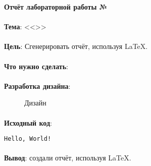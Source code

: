\documentclass[12pt, a4paper, simple]{eskdtext}
\begin{document}
  

  \begin{center}
    \textbf{Отчёт лабораторной работы №\envReportLabNumber}
  \end{center}

  \paragraph{} \textbf{Тема}: <<\envReportTitle>>

  \paragraph{} \textbf{Цель}: Сгенерировать отчёт, используя \LaTeX.

  \paragraph{} \textbf{Что нужно сделать}:

  \paragraph{} \textbf{Разработка дизайна}:

  \begin{figure}[!h]
    \centering
    \caption{Дизайн}
  \end{figure}

  \paragraph{} \textbf{Исходный код}: 



  \begin{lstlisting}[name=Вывод в консоль]
  Hello, World!
  \end{lstlisting}


  \paragraph{} \textbf{Вывод}:
  создали отчёт, используя \LaTeX.

  \newpage
\end{document}
